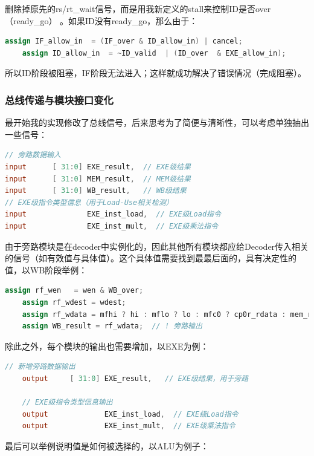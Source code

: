\documentclass[a4paper]{article}
\begin{document}
删除掉原先的rs/rt\_wait信号，而是用我新定义的stall来控制ID是否over（ready\_go） 。如果ID没有ready\_go，那么由于：
\begin{lstlisting}[language=Verilog,caption={级联控制}]
    assign IF_allow_in  = (IF_over & ID_allow_in) | cancel;
    assign ID_allow_in  = ~ID_valid  | (ID_over  & EXE_allow_in);
\end{lstlisting}

所以ID阶段被阻塞，IF阶段无法进入；这样就成功解决了错误情况（完成阻塞）。


\subsubsection{总线传递与模块接口变化}

最开始我的实现修改了总线信号，后来思考为了简便与清晰性，可以考虑单独抽出一些信号：
\begin{lstlisting}[language=Verilog,caption={decoder新添加的信号}]
// 旁路数据输入
input      [ 31:0] EXE_result,  // EXE级结果
input      [ 31:0] MEM_result,  // MEM级结果
input      [ 31:0] WB_result,   // WB级结果
// EXE级指令类型信息（用于Load-Use相关检测）
input              EXE_inst_load,  // EXE级Load指令
input              EXE_inst_mult,  // EXE级乘法指令
\end{lstlisting}

由于旁路模块是在decoder中实例化的，因此其他所有模块都应给Decoder传入相关的信号（如有效值与具体值）。这个具体值需要找到最最后面的，具有决定性的值，以WB阶段举例：

\begin{lstlisting}[language=Verilog,caption={WB阶段向前传递的result}]
    assign rf_wen   = wen & WB_over;
    assign rf_wdest = wdest;
    assign rf_wdata = mfhi ? hi : mflo ? lo : mfc0 ? cp0r_rdata : mem_result;
    assign WB_result = rf_wdata;  // ! 旁路输出
\end{lstlisting}

除此之外，每个模块的输出也需要增加，以EXE为例：

\begin{lstlisting}[language=Verilog,caption={EXE模块新添加的信号}]
    // 新增旁路数据输出
    output     [ 31:0] EXE_result,   // EXE级结果，用于旁路
    
    // EXE级指令类型信息输出
    output             EXE_inst_load,  // EXE级Load指令
    output             EXE_inst_mult,  // EXE级乘法指令
\end{lstlisting}

最后可以举例说明值是如何被选择的，以ALU为例子：
\end{document}
